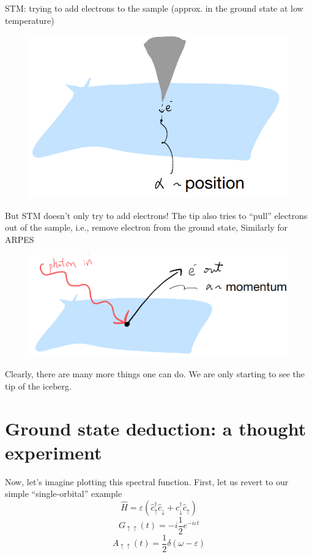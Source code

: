 STM: trying to add electrons to the sample (approx. in the ground state at low temperature)

\begin{figure}[ht]
    \centering
    \includegraphics[width=\textwidth]{jupyterbook/data/fig/lec05-fig02.png}
\end{figure}

But STM doesn't only try to add electrons! The tip also tries to ``pull'' electrons out of the sample, i.e., remove electron from the ground state, Similarly for ARPES

\begin{figure}[ht]
    \centering
    \includegraphics[width=\textwidth]{jupyterbook/data/fig/lec05-fig03.png}
\end{figure}

Clearly, there are many more things one can do. We are only starting to see the tip of the iceberg.

\section{Ground state deduction: a thought experiment}

Now, let's imagine plotting this spectral function. First, let us revert to our simple ``single-orbital'' example
\[ \hat{H}=\varepsilon \left( \hat{c}_{\uparrow}^{\dagger}\hat{c}_{\downarrow}+\hat{c}_{\downarrow}^{\dagger}\hat{c}_{\uparrow} \right) \]
\[ G_{\uparrow \uparrow}\left( t \right) =-i\frac{1}{2}e^{-i\varepsilon t}\]
\[ A_{\uparrow \uparrow}\left( t \right) =\frac{1}{2}\delta \left( \omega -\varepsilon \right) \]

